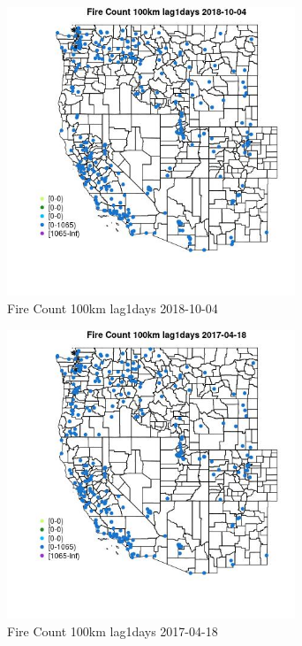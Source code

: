 \begin{figure} 
\centering  
\includegraphics[width=0.77\textwidth]{Code_Outputs/Report_ML_input_PM25_Step4_part_f_de_duplicated_aveswNAs_MapObsFire_Count_100km_lag1days2018-10-04.jpg} 
\caption{\label{fig:Report_ML_input_PM25_Step4_part_f_de_duplicated_aveswNAsMapObsFire_Count_100km_lag1days2018-10-04}Fire Count 100km lag1days 2018-10-04} 
\end{figure} 
 

\begin{figure} 
\centering  
\includegraphics[width=0.77\textwidth]{Code_Outputs/Report_ML_input_PM25_Step4_part_f_de_duplicated_aveswNAs_MapObsFire_Count_100km_lag1days2017-04-18.jpg} 
\caption{\label{fig:Report_ML_input_PM25_Step4_part_f_de_duplicated_aveswNAsMapObsFire_Count_100km_lag1days2017-04-18}Fire Count 100km lag1days 2017-04-18} 
\end{figure} 
 

